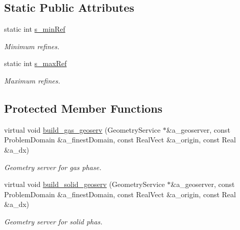 \subsection*{Static Public Attributes}
\begin{DoxyCompactItemize}
\item 
static int \hyperlink{classcomputational__geometry_affc5ce418ac8d3844f114924e6fff55e}{s\+\_\+min\+Ref}
\begin{DoxyCompactList}\small\item\em Minimum refines. \end{DoxyCompactList}\item 
static int \hyperlink{classcomputational__geometry_a0ed00181b6659ac3ac5cfa7e8607977a}{s\+\_\+max\+Ref}
\begin{DoxyCompactList}\small\item\em Maximum refines. \end{DoxyCompactList}\end{DoxyCompactItemize}
\subsection*{Protected Member Functions}
\begin{DoxyCompactItemize}
\item 
virtual void \hyperlink{classcomputational__geometry_ab8c9fe59ff253e37ac3399a68beb9f31}{build\+\_\+gas\+\_\+geoserv} (Geometry\+Service $\ast$\&a\+\_\+geoserver, const Problem\+Domain \&a\+\_\+finest\+Domain, const Real\+Vect \&a\+\_\+origin, const Real \&a\+\_\+dx)
\begin{DoxyCompactList}\small\item\em Geometry server for gas phase. \end{DoxyCompactList}\item 
virtual void \hyperlink{classcomputational__geometry_a63215b61771f0a1b96669e03ba4b81b5}{build\+\_\+solid\+\_\+geoserv} (Geometry\+Service $\ast$\&a\+\_\+geoserver, const Problem\+Domain \&a\+\_\+finest\+Domain, const Real\+Vect \&a\+\_\+origin, const Real \&a\+\_\+dx)
\begin{DoxyCompactList}\small\item\em Geometry server for solid phas. \end{DoxyCompactList}\end{DoxyCompactItemize}
